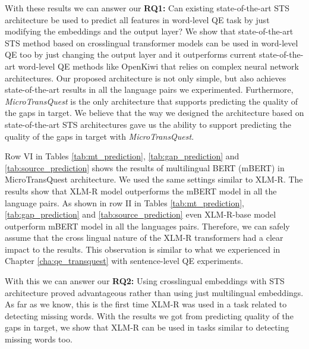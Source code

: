 With these results we can answer our \textbf{RQ1:} Can existing state-of-the-art STS architecture be used to predict all features in word-level QE task by just modifying the embeddings and the output layer? We show that state-of-the-art STS method based on crosslingual transformer models can be used in word-level QE too by just changing the output layer and it outperforms current state-of-the-art word-level QE methods like OpenKiwi that relies on complex neural network architectures. Our proposed architecture is not only simple, but also achieves state-of-the-art results in all the language pairs we experimented. Furthermore, \textit{MicroTransQuest} is the only architecture that supports predicting the quality of the gaps in target. We believe that the way we designed the architecture based on state-of-the-art STS architectures gave us the ability to support predicting the quality of the gaps in target with \textit{MicroTransQuest}.

Row VI in Tables \ref{tab:mt_prediction}, \ref{tab:gap_prediction} and \ref{tab:source_prediction} shows the results of multilingual BERT (mBERT) in MicroTransQuest architecture. We used the same settings similar to XLM-R. The results show that XLM-R model outperforms the mBERT model in all the language pairs. As shown in row II in Tables \ref{tab:mt_prediction}, \ref{tab:gap_prediction} and \ref{tab:source_prediction} even XLM-R-base model outperform mBERT model in all the languages pairs. Therefore, we can safely assume that the cross lingual nature of the XLM-R transformers had a clear impact to the results. This observation is similar to what we experienced in Chapter \ref{cha:qe_transquest} with sentence-level QE experiments.

With this we can answer our \textbf{RQ2:} Using crosslingual embeddings with STS architecture proved advantageous rather than using just multilingual embeddings. As far as we know, this is the first time XLM-R was used in a task related to detecting missing words. With the results we got from predicting quality of the gaps in target, we show that XLM-R can be used in tasks similar to detecting missing words too.
 

